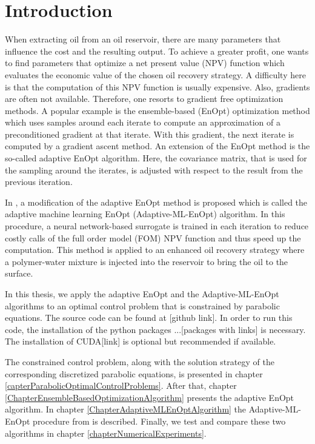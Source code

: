 \chapter{Introduction}

When extracting oil from an oil reservoir, there are many parameters that influence the cost and the resulting output. To achieve a greater profit, one wants to find parameters that optimize a net present value (NPV) function which evaluates the economic value of the chosen oil recovery strategy. A difficulty here is that the computation of this NPV function is usually expensive. Also, gradients are often not available. Therefore, one resorts to gradient free optimization methods. A popular example is the ensemble-based (EnOpt) optimization method which uses samples around each iterate to compute an approximation of a preconditioned gradient at that iterate. With this gradient, the next iterate is computed by a gradient ascent method. An extension of the EnOpt method is the so-called adaptive EnOpt algorithm. Here, the covariance matrix, that is used for the sampling around the iterates, is adjusted with respect to the result from the previous iteration.

In \cite{Keil2022-dj}, a modification of the adaptive EnOpt method is proposed which is called the adaptive machine learning EnOpt (Adaptive-ML-EnOpt) algorithm. In this procedure, a neural network-based surrogate is trained in each iteration to reduce costly calls of the full order model (FOM) NPV function and thus speed up the computation. This method is applied to an enhanced oil recovery strategy where a polymer-water mixture is injected into the reservoir to bring the oil to the surface.

In this thesis, we apply the adaptive EnOpt and the Adaptive-ML-EnOpt algorithms to an optimal control problem that is constrained by parabolic equations. The source code can be found at [github link]. In order to run this code, the installation of the python packages ...[packages with links] is necessary. The installation of CUDA[link] is optional but recommended if available.

The constrained control problem, along with the solution strategy of the corresponding discretized parabolic equations, is presented in chapter \ref{capterParabolicOptimalControlProblems}. After that, chapter \ref{ChapterEnsembleBasedOptimizationAlgorithm} presents the adaptive EnOpt algorithm. In chapter \ref{ChapterAdaptiveMLEnOptAlgorithm} the Adaptive-ML-EnOpt procedure from \cite{Keil2022-dj} is described. Finally, we test and compare these two algorithms in chapter \ref{chapterNumericalExperiments}.